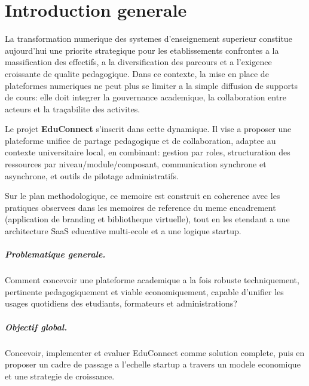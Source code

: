 ﻿\documentclass[12pt,a4paper,oneside]{report}
\begin{document}
\tableofcontents
\clearpage
\listoffigures
\clearpage
\listoftables
\clearpage

\setcounter{page}{1}


\chapter*{Introduction generale}

La transformation numerique des systemes d'enseignement superieur constitue aujourd'hui une priorite strategique pour les etablissements confrontes a la massification des effectifs, a la diversification des parcours et a l'exigence croissante de qualite pedagogique. Dans ce contexte, la mise en place de plateformes numeriques ne peut plus se limiter a la simple diffusion de supports de cours: elle doit integrer la gouvernance academique, la collaboration entre acteurs et la traçabilite des activites.

Le projet \textbf{EduConnect} s'inscrit dans cette dynamique. Il vise a proposer une plateforme unifiee de partage pedagogique et de collaboration, adaptee au contexte universitaire local, en combinant: gestion par roles, structuration des ressources par niveau/module/composant, communication synchrone et asynchrone, et outils de pilotage administratifs.

Sur le plan methodologique, ce memoire est construit en coherence avec les pratiques observees dans les memoires de reference du meme encadrement (application de branding et bibliotheque virtuelle), tout en les etendant a une architecture SaaS educative multi-ecole et a une logique startup.

\paragraph{Problematique generale.}
Comment concevoir une plateforme academique a la fois robuste techniquement, pertinente pedagogiquement et viable economiquement, capable d'unifier les usages quotidiens des etudiants, formateurs et administrations?

\paragraph{Objectif global.}
Concevoir, implementer et evaluer EduConnect comme solution complete, puis en proposer un cadre de passage a l'echelle startup a travers un modele economique et une strategie de croissance.
\end{document}
